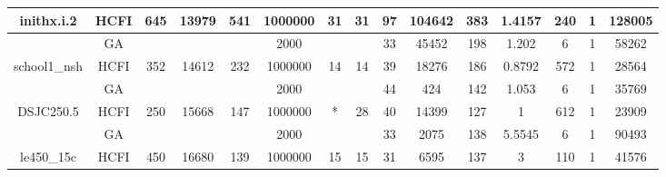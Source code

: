 \documentclass[10pt]{article}
\begin{document}
\begin{center}
\begin{table}[H]
\begin{tabular}{|c|c|c|c|c|c|c|c|c|c|c|c|c|c|c|}
 \multirow{-2}{*}{inithx.i.2} &HCFI   &\multirow{-2}{*}{645}   &\multirow{-2}{*}{13979}     &\multirow{-2}{*}{541}     &1000000     &\multirow{-2}{*}{\cellcolor{yellow}31}      & \multirow{-2}{*}{\cellcolor{yellow}31}    &{\cellcolor{green}97}     &104642         &383    &1.4157         &240    &1     & 128005        \\ \hline \hline
	&GA&       &                   &                     &  2000       &     \cellcolor{yellow} & {\cellcolor{yellow}}& {{\cellcolor{green}33}}
&45452   & 198       &  1.202                  & 6                   & 1         &58262        \\ \cline{2-2} \cline{6-6} \cline{9-15}
 \multirow{-2}{*}{school1\_nsh} &HCFI   &\multirow{-2}{*}{352}   &\multirow{-2}{*}{14612}     &\multirow{-2}{*}{232}     &1000000     &\multirow{-2}{*}{\cellcolor{yellow}14}      & \multirow{-2}{*}{\cellcolor{yellow}14}    &{\cellcolor{green}39}     &18276         &186    &0.8792         &572    &1     &28564        \\ \hline \hline
	&GA&       &                   &                     & 2000        &     \cellcolor{yellow} & {\cellcolor{yellow}}& {{\cellcolor{green}44}}
&424   &142        & 1.053                  &6                    &1          &35769        \\ \cline{2-2} \cline{6-6} \cline{9-15}
 \multirow{-2}{*}{DSJC250.5} &HCFI   &\multirow{-2}{*}{250}   &\multirow{-2}{*}{15668}     &\multirow{-2}{*}{147}     &1000000     &\multirow{-2}{*}{\cellcolor{yellow}*}      & \multirow{-2}{*}{\cellcolor{yellow}28}    &{\cellcolor{green}40}     &14399         &127    &1         &612    &1     &23909        \\ \hline \hline
	&GA&       &                   &                     &   2000      &     \cellcolor{yellow} & {\cellcolor{yellow}}& {{\cellcolor{green}33}}
&2075   & 138        &5.5545                   &6                    &  1        &90493        \\ \cline{2-2} \cline{6-6} \cline{9-15}
 \multirow{-2}{*}{le450\_15c} &HCFI   &\multirow{-2}{*}{450}   &\multirow{-2}{*}{16680}     &\multirow{-2}{*}{139}     &1000000     &\multirow{-2}{*}{\cellcolor{yellow}15}      & \multirow{-2}{*}{\cellcolor{yellow}15}    &{\cellcolor{green}31}     &6595         &137    &3         &110    &1     & 41576       \\ \hline \hline

\end{tabular}
\end{table}
\end{center}
\end{document}

